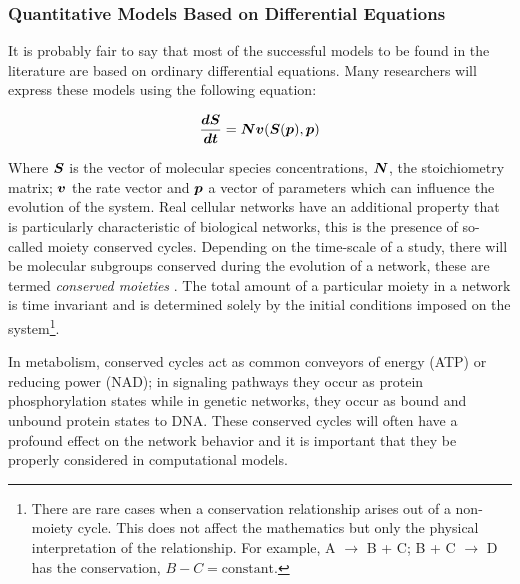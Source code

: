 \subsubsection{Quantitative Models Based on Differential Equations}

It is probably fair to say that most of the successful models to be
found in the literature are based on ordinary differential equations.
Many researchers will express these models using the following equation:

\begin{equation} \label{eq:system}
        \frac{\mbox{\boldmath $dS$}}{\mbox{\boldmath $dt$}} = \mbox{\boldmath $N$} \mbox{\boldmath $v$} (\mbox{\boldmath $S$} (\mbox{\boldmath $p$}), \mbox{\boldmath $p$})
\end{equation}

Where $\mbox{\boldmath $S$}$ is the vector of molecular species concentrations, $\mbox{\boldmath $N$}$,
the stoichiometry matrix; $\mbox{\boldmath $v$}$ the rate vector and $\mbox{\boldmath $p$}$ a vector of
parameters which can influence the evolution of the system. Real
cellular networks have an additional property that is particularly
characteristic of biological networks, this is the presence of so-called
moiety conserved cycles. Depending on the time-scale of a study, there
will be molecular subgroups conserved during the evolution of a network,
these are termed \emph{conserved moieties} \autocite{Re81}. The total
amount of a particular moiety in a network is time invariant and is
determined solely by the initial conditions imposed on the
system\footnote{There are rare cases when a conservation relationship
  arises out of a non-moiety cycle. This does not affect the mathematics
  but only the physical interpretation of the relationship. For example,
  A $\rightarrow$ B + C; B + C $\rightarrow$ D has the conservation,
  $B - C =\mbox{constant}$.}.

In metabolism, conserved cycles act as common conveyors of energy (ATP)
or reducing power (NAD); in signaling pathways they occur as protein
phosphorylation states while in genetic networks, they occur as bound
and unbound protein states to DNA. These conserved cycles will often
have a profound effect on the network behavior and it is important that
they be properly considered in computational models.

